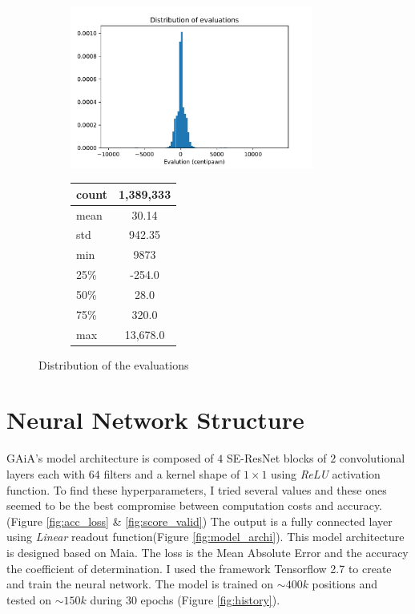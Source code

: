 \documentclass[a4paper]{article}
\begin{document}
\begin{figure}[H]
  \centering
  \begin{subfigure}{.5\textwidth}
    \centering
    \includegraphics[width=8cm]{distribution.pdf}
  \end{subfigure}%
  \begin{subfigure}{.5\textwidth}
    \centering
    \begin{tabular}{ | l | c | }
      \hline
      count & 1,389,333 \\ \hline
      mean  & 30.14 \\ \hline
      std   & 942.35\\ \hline
      min   & 9873\\ \hline
      25\%  & -254.0\\ \hline
      50\%  & 28.0\\ \hline
      75\%  & 320.0\\ \hline
      max   & 13,678.0\\ \hline
    \end{tabular}
  \end{subfigure}
  \caption{Distribution of the evaluations}
  \label{fig:distribution}
  \end{figure}

\section{Neural Network Structure}
GAiA's model architecture is composed of $4$ SE-ResNet blocks of $2$ convolutional layers
each with $64$ filters and a kernel shape of $1\times1$ using \textit{ReLU} activation function.
To find these hyperparameters, I tried several values and these ones seemed to be
the best compromise between computation costs and accuracy.
(Figure \ref{fig:acc_loss} \& \ref{fig:score_valid})
The output is a fully connected layer using \textit{Linear} readout function(Figure \ref{fig:model_archi}).
This model architecture is designed based on Maia\cite{maia}.
The loss is the Mean Absolute Error and the accuracy the coefficient of determination.
I used the framework Tensorflow 2.7 to create and train the neural network.
The model is trained on $\sim 400k$ positions and tested on $\sim 150k$ during 30 epochs (Figure \ref{fig:history}).
\end{document}
